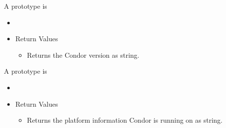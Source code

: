 \begin{description}
\item []
  A prototype is 

  \begin{itemize}
    \item[] 
    \item[] Return Values
    \begin{itemize}
      \item[] Returns the Condor version as string.
    \end{itemize}
  \end{itemize}  

\item []
  A prototype is 

  \begin{itemize}
    \item[] 
    \item[] Return Values
    \begin{itemize}
      \item[] Returns the platform information Condor is running on as string.
    \end{itemize}
  \end{itemize}  

\end{description}


